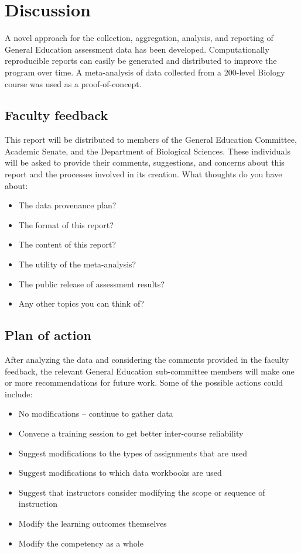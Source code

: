 \documentclass[fleqn,10pt]{SelfArx}\usepackage[]{graphicx}\usepackage[]{color}
\begin{document}
\section{Discussion}

A novel approach for the collection, aggregation, analysis, and reporting of General Education assessment data has been developed. Computationally reproducible reports can easily be generated and distributed to improve the program over time. A meta-analysis of data collected from a 200-level Biology course was used as a proof-of-concept.


\subsection{Faculty feedback}
This report will be distributed to members of the General Education Committee, Academic Senate, and the Department of Biological Sciences.  These individuals will be asked to provide their comments, suggestions, and concerns about this report and the processes involved in its creation. What thoughts do you have about:

\begin{itemize}[noitemsep]
\item The data provenance plan?
\item The format of this report?
\item The content of this report?
\item The utility of the meta-analysis?
\item The public release of assessment results?
\item Any other topics you can think of?
\end{itemize}

\subsection{Plan of action}
After analyzing the data and considering the comments provided in the faculty feedback, the relevant General Education sub-committee members will make one or more recommendations for future work. Some of the possible actions could include:
\begin{itemize}[noitemsep] %
\item No modifications -- continue to gather data
\item Convene a training session to get better inter-course reliability
\item Suggest modifications to the types of assignments that are used
\item Suggest modifications to which data workbooks are used
\item Suggest that instructors consider modifying the scope or sequence of instruction
\item Modify the learning outcomes themselves
\item Modify the competency as a whole
\end{itemize}
\end{document}
